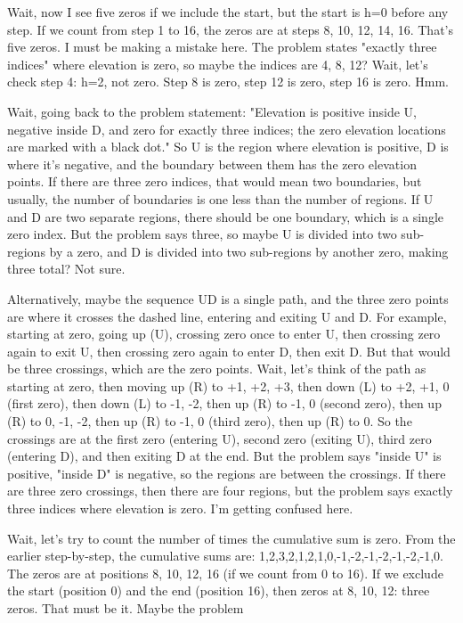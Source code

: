 Wait, now I see five zeros if we include the start, but the start is h=0 before any step. If we count from step 1 to 16, the zeros are at steps 8, 10, 12, 14, 16. That's five zeros. I must be making a mistake here. The problem states "exactly three indices" where elevation is zero, so maybe the indices are 4, 8, 12? Wait, let's check step 4: h=2, not zero. Step 8 is zero, step 12 is zero, step 16 is zero. Hmm.

Wait, going back to the problem statement: "Elevation is positive inside U, negative inside D, and zero for exactly three indices; the zero elevation locations are marked with a black dot." So U is the region where elevation is positive, D is where it's negative, and the boundary between them has the zero elevation points. If there are three zero indices, that would mean two boundaries, but usually, the number of boundaries is one less than the number of regions. If U and D are two separate regions, there should be one boundary, which is a single zero index. But the problem says three, so maybe U is divided into two sub-regions by a zero, and D is divided into two sub-regions by another zero, making three total? Not sure.

Alternatively, maybe the sequence UD is a single path, and the three zero points are where it crosses the dashed line, entering and exiting U and D. For example, starting at zero, going up (U), crossing zero once to enter U, then crossing zero again to exit U, then crossing zero again to enter D, then exit D. But that would be three crossings, which are the zero points. Wait, let's think of the path as starting at zero, then moving up (R) to +1, +2, +3, then down (L) to +2, +1, 0 (first zero), then down (L) to -1, -2, then up (R) to -1, 0 (second zero), then up (R) to 0, -1, -2, then up (R) to -1, 0 (third zero), then up (R) to 0. So the crossings are at the first zero (entering U), second zero (exiting U), third zero (entering D), and then exiting D at the end. But the problem says "inside U" is positive, "inside D" is negative, so the regions are between the crossings. If there are three zero crossings, then there are four regions, but the problem says exactly three indices where elevation is zero. I'm getting confused here.

Wait, let's try to count the number of times the cumulative sum is zero. From the earlier step-by-step, the cumulative sums are: 1,2,3,2,1,2,1,0,-1,-2,-1,-2,-1,-2,-1,0. The zeros are at positions 8, 10, 12, 16 (if we count from 0 to 16). If we exclude the start (position 0) and the end (position 16), then zeros at 8, 10, 12: three zeros. That must be it. Maybe the problem